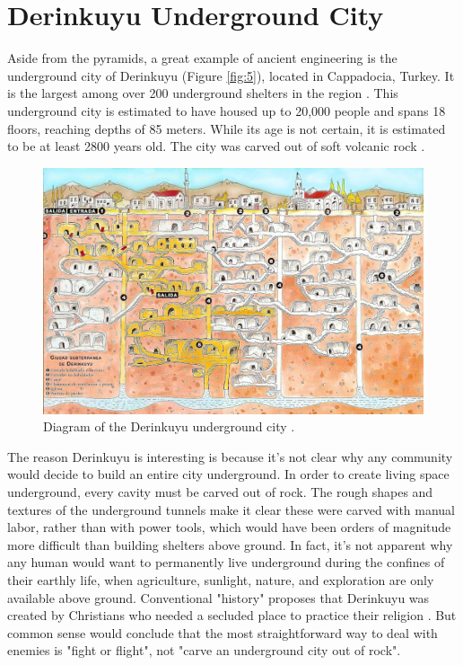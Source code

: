 \documentclass[10pt,twocolumn,letterpaper]{article}
\begin{document}
\section{Derinkuyu Underground City}

Aside from the pyramids, a great example of ancient engineering is the underground city of Derinkuyu (Figure \ref{fig:5}), located in Cappadocia, Turkey. It is the largest among over 200 underground shelters in the region \cite{54}. This underground city is estimated to have housed up to 20,000 people and spans 18 floors, reaching depths of 85 meters. While its age is not certain, it is estimated to be at least 2800 years old. The city was carved out of soft volcanic rock \cite{52, 53}.

\begin{figure}[b]
\begin{center}
   \includegraphics[width=1\linewidth]{derinkuyu.jpeg}
\end{center}
   \caption{Diagram of the Derinkuyu underground city \cite{56}.}
\label{fig:5}
\label{fig:onecol}
\end{figure}

The reason Derinkuyu is interesting is because it's not clear why any community would decide to build an entire city underground. In order to create living space underground, every cavity must be carved out of rock. The rough shapes and textures of the underground tunnels make it clear these were carved with manual labor, rather than with power tools, which would have been orders of magnitude more difficult than building shelters above ground. In fact, it's not apparent why any human would want to permanently live underground during the confines of their earthly life, when agriculture, sunlight, nature, and exploration are only available above ground. Conventional "history" proposes that Derinkuyu was created by Christians who needed a secluded place to practice their religion \cite{53}. But common sense would conclude that the most straightforward way to deal with enemies is "fight or flight", not "carve an underground city out of rock".
\end{document}
